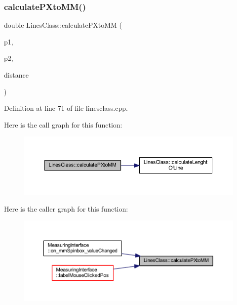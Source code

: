 \subsubsection{\texorpdfstring{calculatePXtoMM()}{calculatePXtoMM()}}
{\footnotesize\ttfamily double Lines\+Class\+::calculate\+P\+Xto\+MM (\begin{DoxyParamCaption}\item[{const Q\+Point}]{p1,  }\item[{const Q\+Point}]{p2,  }\item[{int}]{distance }\end{DoxyParamCaption})\hspace{0.3cm}{\ttfamily [static]}}



Definition at line 71 of file linesclass.\+cpp.

Here is the call graph for this function\+:
\nopagebreak
\begin{figure}[H]
\begin{center}
\leavevmode
\includegraphics[width=350pt]{class_lines_class_a7b00d7bf8c4c9b96d643c2299c52ea62_cgraph}
\end{center}
\end{figure}
Here is the caller graph for this function\+:
\nopagebreak
\begin{figure}[H]
\begin{center}
\leavevmode
\includegraphics[width=350pt]{class_lines_class_a7b00d7bf8c4c9b96d643c2299c52ea62_icgraph}
\end{center}
\end{figure}
\mbox{\label{class_lines_class_a1b656266d53d9364c9969514efd2c878}} 
